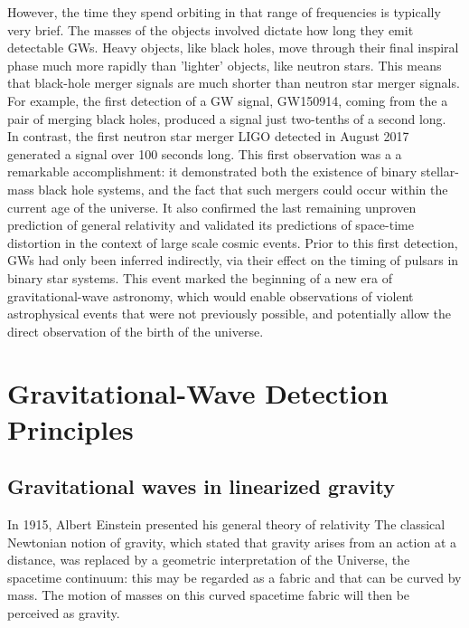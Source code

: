 \documentclass[binding=0.6cm, LaM]{sapthesis}
\begin{document}
	However, the time they spend orbiting in that range of frequencies is typically very brief.
        The masses of the objects involved dictate how long they emit detectable GWs. 
        Heavy objects, like black holes, move through their final inspiral phase much more rapidly than 'lighter' objects, 
        like neutron stars. This means that black-hole merger signals are much shorter than neutron star merger signals.
        For example, the first detection of a GW signal, GW150914, coming from the a pair of merging black holes, 
	produced a signal just two-tenths of a second long. \\
        In contrast, the first neutron star merger LIGO detected in August 2017 generated a signal over 100 seconds long.
	This first observation was a a remarkable accomplishment: it demonstrated both the existence of binary stellar-mass black hole systems, 
	and the fact that such mergers could occur within the current age of the universe.  
	It also confirmed the last remaining unproven prediction of general relativity and validated 
	its predictions of space-time distortion in the context of large scale cosmic events. 
	Prior to this first detection, GWs had only been inferred indirectly,
        via their effect on the timing of pulsars in binary star systems.
	This event  marked the beginning of a new era of gravitational-wave astronomy, 
	which would enable observations of violent astrophysical events that were not previously possible, 
	and potentially allow the direct observation of the birth of the universe.


\chapter{Gravitational-Wave Detection Principles}


\section{Gravitational waves in linearized gravity}

	In 1915, Albert Einstein presented his general theory of relativity
	The classical Newtonian notion of gravity, which stated that gravity arises from an 
	action at a distance, was replaced by a geometric interpretation of the Universe, 
	the spacetime continuum: this may be regarded as a fabric and that can be curved 
	by mass. 
	The motion of masses on this curved spacetime fabric will then be perceived as gravity. 
\end{document}
